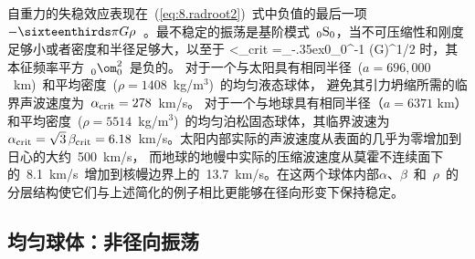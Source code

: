 自重力的失稳效应表现在~(\ref{eq:8.radroot2})~式中负值的最后一项~$-\sixteenthirds\pi G \rho$~。最不稳定的振荡是基阶模式~${}_0{\rm S}_0$，当不可压缩性和刚度足够小或者密度和半径足够大，以至于
\eq
\alpha<\alpha_{\rm crit}
={}_{\raise-.35ex\hbox{\scriptsize\rm 0}\!}\gamma_0^{-1}
(\sixteenthirds\pi G\rho)^{1/2}
\en
时，其本征频率平方~${}_{\raise-.2ex\hbox{\scriptsize\rm 0}}\om^2_0$~是负的。
对于一个与太阳具有相同半径~($a=696,000$~km)~和平均密度~($\rho=1408$~kg/m${}^3$)~的均匀液态球体，
%
避免其引力坍缩所需的临界声波速度为~$\alpha_{\rm crit}=278$~km/s。
%
对于一个与地球具有相同半径（$a=6371$ km）和平均密度~($\rho=5514$~kg/m${}^3$)~的均匀泊松固态球体，其临界波速为~$\alpha_{\rm crit}=\sqrt{3}\,\beta_{\rm crit}=6.18$~km/s。太阳内部实际的声波速度从表面的几乎为零增加到日心的大约~500~km/s，
%
而地球的地幔中实际的压缩波速度从莫霍不连续面下的~8.1~km/s~增加到核幔边界上的~13.7~km/s。在这两个球体内部$\alpha$、$\beta$~和~$\rho$~的分层结构使它们与上述简化的例子相比更能够在径向形变下保持稳定。
%

\renewcommand{\thesubsection}{$\!\!\!\raise1.3ex\hbox{$\star$}\!\!$
\arabic{chapter}.\arabic{section}.\arabic{subsection}}
\subsection{均匀球体：非径向振荡}
%
\renewcommand{\thesubsection}{\arabic{chapter}.\arabic{section}.\arabic{subsection}}

